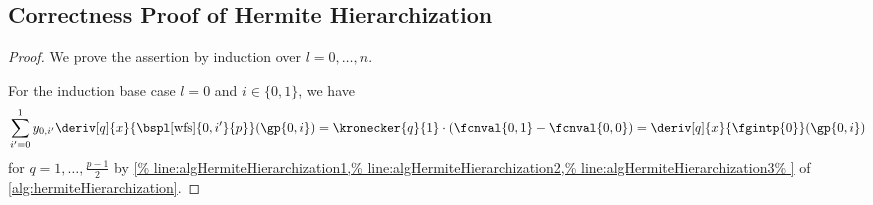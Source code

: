 \subsection{Correctness Proof of Hermite Hierarchization}
\label{sec:a135proofHermiteHierarchization}

\propInvariantHermiteHierarchization*

\begin{proof}
  We prove the assertion by induction over $l = 0, \dotsc, n$.
  
  For the induction base case $l = 0$ and $i \in \{0, 1\}$, we have
  \begin{equation}
    \sum_{i'=0}^1
    \linout{0,i'} \deriv[q]{x}{\bspl[\wfs]{0,i'}{p}}(\gp{0,i})
    = \kronecker{q}{1} \cdot (\fcnval{0,1} - \fcnval{0,0})
    = \deriv[q]{x}{\fgintp{0}}(\gp{0,i})
  \end{equation}
  for $q = 1, \dotsc, \frac{p-1}{2}$ by
  \cref{%
    line:algHermiteHierarchization1,%
    line:algHermiteHierarchization2,%
    line:algHermiteHierarchization3%
  }
  of \cref{alg:hermiteHierarchization}.
  

\end{proof}
